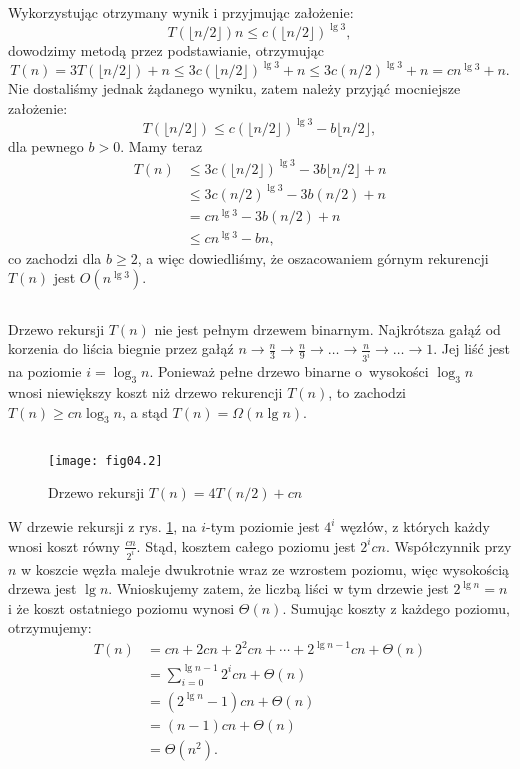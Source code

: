 Wykorzystując otrzymany wynik i przyjmując założenie:
\[
	T(\lfloor n/2\rfloor)n\le c(\lfloor n/2\rfloor)^{\lg 3},
\]
dowodzimy metodą przez podstawianie, otrzymując
\[
	T(n) = 3T(\lfloor n/2\rfloor)+n \le 3c(\lfloor n/2\rfloor)^{\lg 3}+n \le 3c(n/2)^{\lg 3}+n = cn^{\lg 3}+n.
\]
Nie dostaliśmy jednak żądanego wyniku, zatem należy przyjąć mocniejsze założenie:
\[
	T(\lfloor n/2\rfloor) \le c(\lfloor n/2\rfloor)^{\lg 3}-b\lfloor n/2\rfloor,
\]
dla pewnego $b>0$. Mamy teraz
\begin{align*}
	T(n) &\le 3c(\lfloor n/2\rfloor)^{\lg 3}-3b\lfloor n/2\rfloor+n \\
	&\le 3c(n/2)^{\lg 3}-3b(n/2)+n \\
	&= cn^{\lg 3}-3b(n/2)+n \\
	&\le cn^{\lg 3}-bn,
\end{align*}
co zachodzi dla $b\ge2$, a więc dowiedliśmy, że oszacowaniem górnym rekurencji $T(n)$ jest $O(n^{\lg3})$.

\subsection{} %
Drzewo rekursji $T(n)$ nie jest pełnym drzewem binarnym. Najkrótsza gałąź od korzenia do liścia biegnie przez gałąź $n\to\frac{n}{3}\to\frac{n}{9}\to\dots\to\frac{n}{3^i}\to\dots\to1$. Jej liść jest na poziomie $i=\log_3n$. Ponieważ pełne drzewo binarne o~wysokości $\log_3n$ wnosi niewiększy koszt niż drzewo rekurencji $T(n)$, to zachodzi $T(n)\ge cn\log_3n$, a stąd $T(n)=\Omega(n\lg n)$.

\subsection{} %
\begin{figure}[ht]
	\begin{center}
		\texttt{[image: fig04.2]}
	\end{center}
	\caption{Drzewo rekursji $T(n)=4T(n/2)+cn$} \label{fig:4.2-3}
\end{figure}

W drzewie rekursji z rys. \ref{fig:4.2-3}, na $i$-tym poziomie jest $4^i$ węzłów, z których każdy wnosi koszt równy $\frac{cn}{2^i}$. Stąd, kosztem całego poziomu jest $2^icn$. Współczynnik przy $n$ w koszcie węzła maleje dwukrotnie wraz ze wzrostem poziomu, więc wysokością drzewa jest $\lg n$. Wnioskujemy zatem, że liczbą liści w tym drzewie jest $2^{\lg n}=n$ i że koszt ostatniego poziomu wynosi $\Theta(n)$. Sumując koszty z każdego poziomu, otrzymujemy:
\begin{align*}
	T(n) &= cn+2cn+2^2cn+\cdots+2^{\lg n-1}cn+\Theta(n) \\
	&= \sum_{i=0}^{\lg n-1}2^icn+\Theta(n) \\
	&= (2^{\lg n}-1)cn+\Theta(n) \\
	&= (n-1)cn+\Theta(n) \\
	&= \Theta(n^2).
\end{align*}

